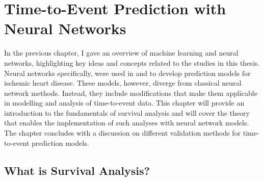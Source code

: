 \chapter{Time-to-Event Prediction with Neural Networks}
\label{survival-analysis}


In the previous chapter, 
I gave an overview of machine learning and neural networks,
highlighting key ideas and concepts related to the studies in this thesis.
Neural networks specifically, 
were used in  and  to develop
prediction models for ischemic heart disease.
These models, however, diverge from classical neural network methods.
Instead, they include modifications that make them applicable
in modelling and analysis of time-to-event data.
This chapter will provide an introduction to the fundamentals
of survival analysis and will cover the
theory that enables the implementation of such analyses with
neural network models.
The chapter concludes with a discussion on different 
validation methods for time-to-event prediction models.

\section{What is Survival Analysis?}

